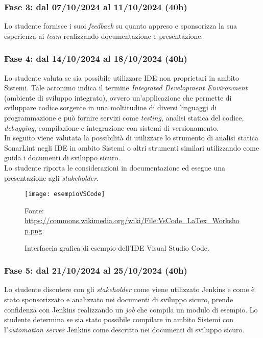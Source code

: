 \subsubsection*{Fase 3: dal 07/10/2024 al 11/10/2024 (40h) }
Lo studente fornisce i suoi \emph{feedback} su quanto appreso e sponsorizza la sua esperienza ai \emph{team} realizzando documentazione e presentazione.\\

\subsubsection*{Fase 4: dal 14/10/2024 al 18/10/2024 (40h) }
Lo studente valuta se sia possibile utilizzare IDE non proprietari in ambito \gls{Sistemi}. Tale acronimo indica il termine \emph{Integrated Development Environment} (ambiente di sviluppo integrato), ovvero un'applicazione che permette di sviluppare codice sorgente in una moltitudine di diversi linguaggi di programmazione e può fornire servizi come \emph{testing}, analisi statica del codice, \emph{debugging}, compilazione e integrazione con sistemi di versionamento.\\ 
In seguito viene valutata la possibilità di utilizzare lo strumento di analisi statica SonarLint negli IDE in ambito \gls{Sistemi} o altri strumenti similari utilizzando come guida i documenti di sviluppo sicuro.\\
Lo studente riporta le considerazioni in documentazione ed esegue una presentazione agli \emph{stakeholder}.\\ 
\begin{figure}[htbp] 
    \centering 
    \texttt{[image: esempioVSCode]}
    \caption{Interfaccia grafica di esempio dell'IDE Visual Studio Code.} 
    \label{fig:esempioVSCode}
    \vspace{1mm}
    Fonte: \url{https://commons.wikimedia.org/wiki/File:VsCode_LaTex_Workshop.png}.
\end{figure}
\subsubsection*{Fase 5: dal 21/10/2024 al 25/10/2024 (40h) }
Lo studente discutere con gli \emph{stakeholder} come viene utilizzato Jenkins e come è stato sponsorizzato e analizzato nei documenti di sviluppo sicuro, prende confidenza con Jenkins realizzando un \emph{job} che compila un modulo di esempio. Lo studente determina se sia stato possibile compilare in ambito \gls{Sistemi} con l'\emph{automation server} Jenkins come descritto nei documenti di sviluppo sicuro.\\

